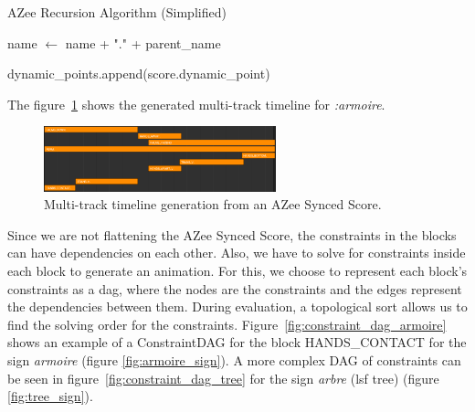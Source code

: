 \documentclass[../../main.tex]{subfiles}
\begin{document}
\begin{algorithm}
    \caption{AZee Recursion Algorithm (Simplified)}
    \label{alg:azee_timeline}
    \begin{algorithmic}[1]
                \State name $\gets$ name + "." + parent\_name
                \State {}
            \EndIf
            
            \State {}
                \State dynamic\_points.append(score.dynamic\_point)
            \EndIf
            
                \State \Return {}
                    \State {}
                \EndFor
            \Else
                \State \Return {}
            \EndIf
            
                \State {}
            \EndIf
        \EndFunction
    \end{algorithmic}
\end{algorithm}

The figure~\ref{fig:azee_timeline} shows the generated multi-track timeline for \emph{:armoire}.

\begin{figure}[h]
    \centering
    \includegraphics[width=0.6\textwidth]{chapters/multi_track/images/azee_timeline.png}
    \caption{Multi-track timeline generation from an AZee Synced Score.}
    \label{fig:azee_timeline}
\end{figure}

Since we are not flattening the AZee Synced Score, the constraints in the blocks can have dependencies on each other. Also, we have to solve for constraints inside each block to generate an animation. For this, we choose to represent each block's constraints as a \gls{dag}, where the nodes are the constraints and the edges represent the dependencies between them. During evaluation, a topological sort allows us to find the solving order for the constraints. Figure~\ref{fig:constraint_dag_armoire} shows an example of a ConstraintDAG for the block HANDS\_CONTACT for the sign \emph{armoire} (figure \ref{fig:armoire_sign}). A more complex DAG of constraints can be seen in figure~\ref{fig:constraint_dag_tree} for the sign \emph{arbre} (\gls{lsf} tree) (figure \ref{fig:tree_sign}).
\end{document}
